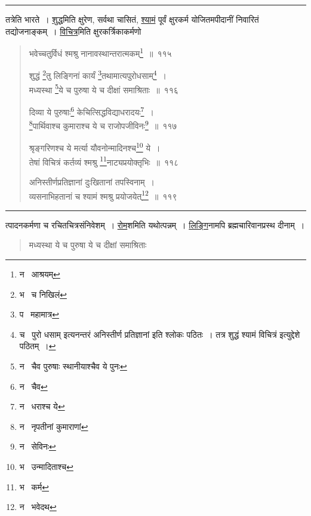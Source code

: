 \documentclass[11pt, openany]{book}
\begin{document}
\hrule

\vspace{2mm}
तत्रेति भारते~। \underline{शुद्ध}मिति क्षुरेण, सर्वथा चासितं, \underline{श्यामं} पूर्वं क्षुरकर्म योजितमपीदानीं निवारितं तद्योजनाङ्कम्~। \underline{विचित्र}मिति क्षुरकर्त्रिकाकर्मणो\textendash

\newpage

\begin{quote}
{\na भवेच्चतुर्विधं श्मश्रु नानावस्थान्तरात्मकम्\renewcommand{\thefootnote}{1}\footnote{न \textendash\ आश्रयम्}~॥~११५

शुद्धं \renewcommand{\thefootnote}{2}\footnote{भ \textendash\ च निखिलं}तु लिङ्गिनां कार्यं \renewcommand{\thefootnote}{3}\footnote{प \textendash\ महामात्र}तथामात्यपुरोधसाम्\renewcommand{\thefootnote}{4}\footnote{च \textendash\ {\qt पुरो धसाम्} इत्यनन्तरं {\qt अनिस्तीर्ण प्रतिज्ञानां} इति श्लोकः पठितः~। तत्र {\qt शुद्धं श्यामं विचित्रं} इत्युद्देशे पठितम्~।}~।\\
मध्यस्था \renewcommand{\thefootnote}{5}\footnote{न \textendash\ चैव पुरुषाः स्थानीयाश्चैव ये पुनः}ये च पुरुषा ये च दीक्षां समाश्रिताः~॥~११६

दिव्या ये पुरुषाः\renewcommand{\thefootnote}{6}\footnote{न \textendash\ चैव} केचित्सिद्धविद्याधरादयः\renewcommand{\thefootnote}{7}\footnote{न \textendash\ धराश्च ये}~।\\
\renewcommand{\thefootnote}{8}\footnote{न \textendash\ नृपतीनां कुमाराणां}पार्थिवाश्च कुमाराश्च ये च राजोपजीविनः\renewcommand{\thefootnote}{9}\footnote{न \textendash\ सेविनः}~॥~११७

श्रृङ्गरिणश्च ये मर्त्या यौवनोन्मादिनश्च\renewcommand{\thefootnote}{10}\footnote{भ \textendash\ उन्मादिताश्च} ये~।\\
तेषां विचित्रं कर्तव्यं श्मश्रु \renewcommand{\thefootnote}{11}\footnote{भ \textendash\ कर्म}नाट्यप्रयोक्तृभिः~॥~११८

अनिस्तीर्णप्रतिज्ञानां दुःखितानां तपस्विनाम्~।\\
व्यसनाभिहतानां च श्यामं श्मश्रु प्रयोजयेत्\renewcommand{\thefootnote}{12}\footnote{न \textendash\ भवेदथ}~॥~११९}
\end{quote}

\hrule

\vspace{2mm}
\noindent
त्पादनकर्मणा च रचितचित्रसंनिवेशम्~। \underline{रोम}शमिति यथोत्पन्नम्~। \underline{लिङ्गि}नामपि ब्रह्मचारिवानप्रस्थ दीनाम्~।

\begin{quote}
{\qt मध्यस्था ये च पुरुषा ये च दीक्षां समाश्रिताः}
\end{quote}
\end{document}
